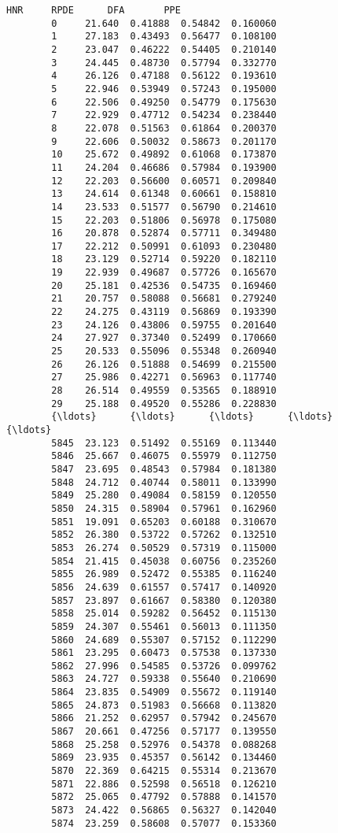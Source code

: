 \documentclass[11pt]{article}
\begin{document}
\begin{Verbatim}[commandchars=\\\{\}]
                 HNR     RPDE      DFA       PPE  
        0     21.640  0.41888  0.54842  0.160060  
        1     27.183  0.43493  0.56477  0.108100  
        2     23.047  0.46222  0.54405  0.210140  
        3     24.445  0.48730  0.57794  0.332770  
        4     26.126  0.47188  0.56122  0.193610  
        5     22.946  0.53949  0.57243  0.195000  
        6     22.506  0.49250  0.54779  0.175630  
        7     22.929  0.47712  0.54234  0.238440  
        8     22.078  0.51563  0.61864  0.200370  
        9     22.606  0.50032  0.58673  0.201170  
        10    25.672  0.49892  0.61068  0.173870  
        11    24.204  0.46686  0.57984  0.193900  
        12    22.203  0.56600  0.60571  0.209840  
        13    24.614  0.61348  0.60661  0.158810  
        14    23.533  0.51577  0.56790  0.214610  
        15    22.203  0.51806  0.56978  0.175080  
        16    20.878  0.52874  0.57711  0.349480  
        17    22.212  0.50991  0.61093  0.230480  
        18    23.129  0.52714  0.59220  0.182110  
        19    22.939  0.49687  0.57726  0.165670  
        20    25.181  0.42536  0.54735  0.169460  
        21    20.757  0.58088  0.56681  0.279240  
        22    24.275  0.43119  0.56869  0.193390  
        23    24.126  0.43806  0.59755  0.201640  
        24    27.927  0.37340  0.52499  0.170660  
        25    20.533  0.55096  0.55348  0.260940  
        26    26.126  0.51888  0.54699  0.215500  
        27    25.986  0.42271  0.56963  0.117740  
        28    26.514  0.49559  0.53565  0.188910  
        29    25.188  0.49520  0.55286  0.228830  
        {\ldots}      {\ldots}      {\ldots}      {\ldots}       {\ldots}  
        5845  23.123  0.51492  0.55169  0.113440  
        5846  25.667  0.46075  0.55979  0.112750  
        5847  23.695  0.48543  0.57984  0.181380  
        5848  24.712  0.40744  0.58011  0.133990  
        5849  25.280  0.49084  0.58159  0.120550  
        5850  24.315  0.58904  0.57961  0.162960  
        5851  19.091  0.65203  0.60188  0.310670  
        5852  26.380  0.53722  0.57262  0.132510  
        5853  26.274  0.50529  0.57319  0.115000  
        5854  21.415  0.45038  0.60756  0.235260  
        5855  26.989  0.52472  0.55385  0.116240  
        5856  24.639  0.61557  0.57417  0.140920  
        5857  23.897  0.61667  0.58380  0.120380  
        5858  25.014  0.59282  0.56452  0.115130  
        5859  24.307  0.55461  0.56013  0.111350  
        5860  24.689  0.55307  0.57152  0.112290  
        5861  23.295  0.60473  0.57538  0.137330  
        5862  27.996  0.54585  0.53726  0.099762  
        5863  24.727  0.59338  0.55640  0.210690  
        5864  23.835  0.54909  0.55672  0.119140  
        5865  24.873  0.51983  0.56668  0.113820  
        5866  21.252  0.62957  0.57942  0.245670  
        5867  20.661  0.47256  0.57177  0.139550  
        5868  25.258  0.52976  0.54378  0.088268  
        5869  23.935  0.45357  0.56142  0.134460  
        5870  22.369  0.64215  0.55314  0.213670  
        5871  22.886  0.52598  0.56518  0.126210  
        5872  25.065  0.47792  0.57888  0.141570  
        5873  24.422  0.56865  0.56327  0.142040  
        5874  23.259  0.58608  0.57077  0.153360  
        

\end{Verbatim}
\end{document}
